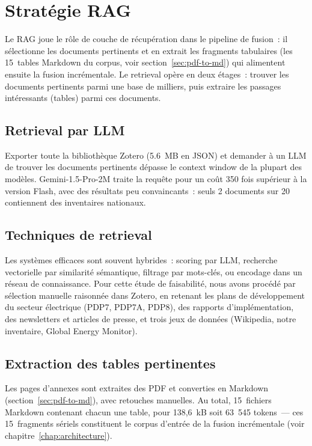 \documentclass[a4paper,11pt]{report}
\begin{document}
\section{Stratégie RAG}

Le RAG joue le rôle de couche de récupération dans le pipeline de fusion~: il sélectionne les documents pertinents et en extrait les fragments tabulaires (les 15~tables Markdown du corpus, voir section~\ref{sec:pdf-to-md}) qui alimentent ensuite la fusion incrémentale. Le retrieval opère en deux étages~: trouver les documents pertinents parmi une base de milliers, puis extraire les passages intéressants (tables) parmi ces documents.

\subsection{Retrieval par LLM}

Exporter toute la bibliothèque Zotero (5.6~MB en JSON) et demander à un LLM de trouver les documents pertinents dépasse le context window de la plupart des modèles. Gemini-1.5-Pro-2M traite la requête pour un coût 350 fois supérieur à la version Flash, avec des résultats peu convaincants~: seuls 2 documents sur 20 contiennent des inventaires nationaux.

\subsection{Techniques de retrieval}

Les systèmes efficaces sont souvent hybrides~: scoring par LLM, recherche vectorielle par similarité sémantique, filtrage par mots-clés, ou encodage dans un réseau de connaissance. Pour cette étude de faisabilité, nous avons procédé par sélection manuelle raisonnée dans Zotero, en retenant les plans de développement du secteur électrique (PDP7, PDP7A, PDP8), des rapports d'implémentation, des newsletters et articles de presse, et trois jeux de données (Wikipedia, notre inventaire, Global Energy Monitor).

\subsection{Extraction des tables pertinentes}

Les pages d'annexes sont extraites des PDF et converties en Markdown (section~\ref{sec:pdf-to-md}), avec retouches manuelles. Au total, 15~fichiers Markdown contenant chacun une table, pour 138,6~kB soit 63~545 tokens~--- ces 15~fragments sériels constituent le corpus d'entrée de la fusion incrémentale (voir chapitre~\ref{chap:architecture}).
\end{document}
